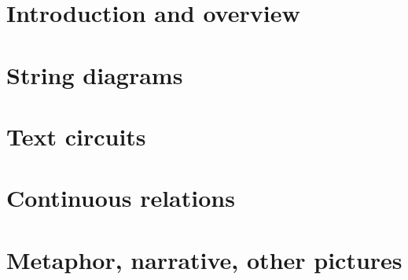 



\maketitle%

\begin{fullwidth}
\begin{multicols}{2}
\tableofcontents
\end{multicols}
\end{fullwidth}

\setcounter{chapter}{-1}
\chapter{Introduction and overview}
\clearpage


\chapter{String diagrams}\label{chapter:stringdiagrams}
\clearpage

\clearpage

\clearpage

\clearpage

\clearpage

\chapter{Text circuits}\label{chapter:textcircuits}
\clearpage


\clearpage

\chapter{Continuous relations}
\clearpage

\clearpage

\clearpage

\clearpage

\clearpage

\clearpage

\chapter{Metaphor, narrative, other pictures}
\clearpage


\clearpage






